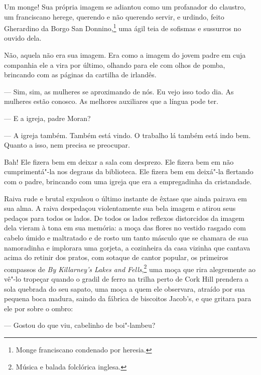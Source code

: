 Um monge! Sua própria imagem se adiantou como um profanador do claustro,
um franciscano herege, querendo e não querendo servir, e urdindo, feito
Gherardino da Borgo San Donnino,\footnote{ Monge franciscano condenado
por heresia.} uma ágil teia de sofismas e sussurros no ouvido dela.

Não, aquela não era sua imagem. Era como a imagem do jovem padre em cuja
companhia ele a vira por último, olhando para ele com olhos de pomba,
brincando com as páginas da cartilha de irlandês.

 --- Sim, sim, as mulheres se aproximando de nós. Eu vejo isso todo dia. As
mulheres estão conosco. As melhores auxiliares que a língua pode ter.

 --- E a igreja, padre Moran?

 --- A igreja também. Também está vindo. O trabalho lá também está indo
bem. Quanto a isso, nem precisa se preocupar.

Bah! Ele fizera bem em deixar a sala com desprezo. Ele fizera bem em não
cumprimentá"-la nos degraus da biblioteca. Ele fizera bem em deixá"-la
flertando com o padre, brincando com uma igreja que era a empregadinha
da cristandade.

Raiva rude e brutal expulsou o último instante de êxtase que ainda
pairava em sua alma. A raiva despedaçou violentamente sua bela imagem e
atirou seus pedaços para todos os lados. De todos os lados reflexos
distorcidos da imagem dela vieram à tona em sua memória: a moça das
flores no vestido rasgado com cabelo úmido e maltratado e de rosto um
tanto másculo que se chamara de sua namoradinha e implorara uma
gorjeta, a cozinheira da casa vizinha que cantava acima do retinir dos
pratos, com sotaque de cantor popular, os primeiros compassos de
\textit{By Killarney’s Lakes and Fells},\footnote{ Música e balada folclórica inglesa.} uma moça que
rira alegremente ao vê"-lo tropeçar quando o gradil de ferro na trilha
perto de Cork Hill prendera a sola quebrada do seu sapato, uma moça a
quem ele observara, atraído por sua pequena boca madura, saindo da
fábrica de biscoitos Jacob’s, e que gritara para ele por sobre o ombro:

 --- Gostou do que viu, cabelinho de boi"-lambeu?

